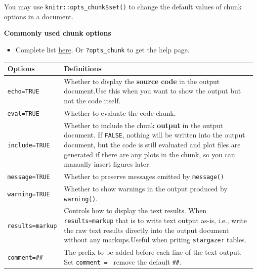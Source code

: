 \documentclass[
  a4paper,
  twoside,
  openright]{book}
\providecommand{\tightlist}{%
  \setlength{\itemsep}{0pt}\setlength{\parskip}{0pt}}
\theoremstyle{definition}
\theoremstyle{definition}
\theoremstyle{definition}
\theoremstyle{definition}
\theoremstyle{remark}
\begin{document}
You may use \texttt{knitr::opts\_chunk\$set()} to change the default values of chunk options in a document.

\textbf{Commonly used chunk options}

\begin{itemize}
\tightlist
\item
  Complete list \href{https://yihui.org/knitr/options/}{here}. Or \texttt{?opts\_chunk} to get the help page.
\end{itemize}

\begin{longtable}[]{@{}
  >{\raggedright\arraybackslash}p{}
  >{\raggedright\arraybackslash}p{}@{}}
\toprule\noalign{}
\begin{minipage}[b]{\linewidth}\raggedright
Options
\end{minipage} & \begin{minipage}[b]{\linewidth}\raggedright
Definitions
\end{minipage} \\
\midrule\noalign{}
\endhead
\bottomrule\noalign{}
\endlastfoot
\texttt{echo=TRUE} & Whether to display the \textbf{source code} in the output document.Use this when you want to show the output but not the code itself. \\
\texttt{eval=TRUE} & Whether to evaluate the code chunk. \\
\texttt{include=TRUE} & Whether to include the {chunk \textbf{output}} in the output document. If \texttt{FALSE}, nothing will be written into the output document, but the code is still evaluated and plot files are generated if there are any plots in the chunk, so you can manually insert figures later. \\
\texttt{message=TRUE} & Whether to preserve messages emitted by \texttt{message()} \\
\texttt{warning=TRUE} & Whether to show warnings in the output produced by \texttt{warning()}. \\
\texttt{results=\textquotesingle{}markup\textquotesingle{}} & Controls how to display the text results. When \texttt{results=\textquotesingle{}markup\textquotesingle{}} that is to write text output as-is, i.e., write the raw text results directly into the output document without any markups.Useful when priting \texttt{stargazer} tables. \\
\texttt{comment=\textquotesingle{}\#\#\textquotesingle{}} & The prefix to be added before each line of the text output. Set \texttt{comment\ =\ \textquotesingle{}\textquotesingle{}} remove the default \texttt{\#\#}. \\

\end{longtable}
\end{document}
